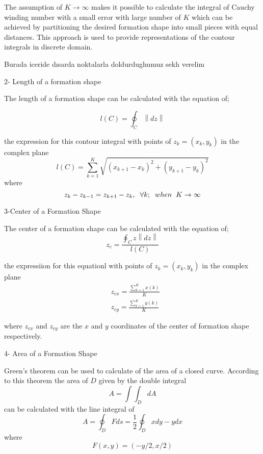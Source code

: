 \documentclass[twoside]{article}
\newcommand{\norm}[1]{\left\lVert#1\right\rVert}
\begin{document}
\begin{multicols}{2}
		
The assumption of $K \to\infty$ makes it possible to calculate the integral of Cauchy winding number with a small error with large number of $K$ which can be achieved by partitioning the desired formation shape  into small pieces with equal  distances. This approach is used to provide representations of the contour integrals in discrete domain. 

Burada iceride dısarda noktalarla doldurdughumuz seklı verelim
		
		2- Length of a formation shape
		
		The length of a formation shape can be calculated with the equation of;
		
		\begin{equation}
       l(C)= \oint_C \norm{dz}
		\end{equation}
		
		the expression for this contour integral with points of   $z_k = (x_k,y_k)$ in the complex plane
		\begin{equation}
l(C) = \sum_{k=1}^{K}\sqrt{(x_{k+1} - x_k)^2 + (y_{k+1} - y_k)^2}
		\end{equation}
				where
				\begin{equation}
				z_k - z_{k-1} = z_{k+1} - z_k, \hspace{0.2cm}  \forall k ;  \hspace{0.2cm} when  \hspace{0.2cm} K \to\infty
				\end{equation}
		
		3-Center of a Formation Shape
		
	The center of a formation shape can be calculated with the equation of;
	\begin{equation}
 z_c = \frac{\oint_C z\norm{dz}}{l(C)}
	\end{equation}
		
				the expressiion for this equationl with points of  $z_k = (x_k,y_k)$ in the complex plane
				\begin{align*}
&z_{cx} = \frac{\sum_{k=1}^{K}x(k)}{K}  \\
&z_{cy} = \frac{\sum_{k=1}^{K}y(k)}{K}  
				\end{align*}
		
		where $z_{cx}$ and $z_{cy}$ are the $x$ and $y$ coordinates of the center of formation shape respectively.
		
		4- Area of a Formation Shape
		
		Green's theorem can be used to calculate of the area of a closed curve. According to this theorem the area of $D$ given by the double integral
		\begin{equation}
 A = \int\int_D dA
		\end{equation}
		can be calculated with the line integral of
		\begin{equation}
 A = \oint_D F ds = \frac{1}{2} \oint_D xdy - ydx
		\end{equation}
where
\begin{equation}
F(x,y) = (-y/2,x/2)
\end{equation}
		

\end{multicols}
\end{document}
